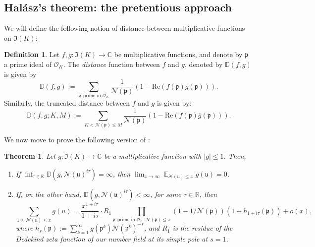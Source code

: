 \documentclass[11pt]{amsart}
\newtheorem{theorem}[lemma]{Theorem}
\theoremstyle{definition}
\newtheorem{definition}[lemma]{Definition}
\DeclareMathOperator*{\E}{\mathbb{E}}
\newcommand{\C}{{\mathbb C}}
\newcommand{\D}{{\mathbb D}}
\newcommand{\NN}{{\mathcal N}}
\newcommand{\R}{{\mathbb R}}
\newcommand{\mf}{\mathfrak}
\begin{document}
 
 



\subsection{Hal\'asz's theorem: the pretentious approach}
\iffalse
We will define the following notion of distance between multiplicative functions on $\mf I(K)$:
\begin{definition}
Let $f,g\colon\mf  I(K)\to\C$ be multiplicative functions, and denote by $\mf p$ a prime ideal of $\mathcal{O}_K$. The \emph{distance} function between $f$ and $g$, denoted by $\D(f,g)$ is given by
$$\D(f,g):=\sum_{\mf p\colon \text{prime in } \mathcal{O}_K}\frac{1}{\NN(\mf p)}(1-\text{Re}(f(\mf p)\overline{g}(\mf p))).$$
Similarly, the truncated distance between $f$ and $g$ is given by:
$$\D(f,g;K,M):=\sum_{K<\NN(\mf p)\leq M}\frac{1}{\NN(\mf p)}(1-\text{Re}(f(\mf p)\overline{g}(\mf p))).$$
\end{definition}

 

 


We now move to prove the following version of \cite[Theorem~6.2]{E79book}:
\begin{theorem}\label{C22}
     Let $g\colon\mf I(K)\to\C$ be a multiplicative function with $\vert g\vert\leq 1$. Then, 
     \begin{enumerate}
         \item If $\inf_{\tau\in\R}\D(g,\NN(\mf u)^{i\tau})=\infty$, then $\lim_{x \to \infty} \E_{\NN(\mf u)\leq x}g(\mf u)=0$.
         \item If, on the other hand, $\D(g,\NN(\mf u)^{i\tau})<\infty$, for some $\tau\in\R$, then
         $$\sum_{1 \leq \NN(\mf u)\leq x}g(u) = \frac{x^{1+i\tau}}{1+i\tau}\cdot R_1\prod_{\mf p\colon \text{prime in } \mathcal{O}_K,\NN(\mf p)\leq x}(1-1/\NN(\mf p))(1+h_{1+i\tau}(\mf p))+o(x),$$
         where $h_{s}(\mf p):=\sum_{k=1}^{\infty}g(\mf p^{k})\NN(\mf p^{k})^{-s}$, and $R_1$ is the residue of the Dedekind zeta function of our number field at its simple pole at $s=1$.
     \end{enumerate}
\end{theorem}
\end{document}
